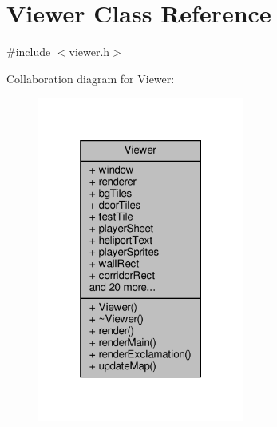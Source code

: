 \hypertarget{classViewer}{}\section{Viewer Class Reference}
\label{classViewer}


{\ttfamily \#include $<$viewer.\+h$>$}



Collaboration diagram for Viewer\+:
\nopagebreak
\begin{figure}[H]
\begin{center}
\leavevmode
\includegraphics[width=193pt]{classViewer__coll__graph}
\end{center}
\end{figure}

